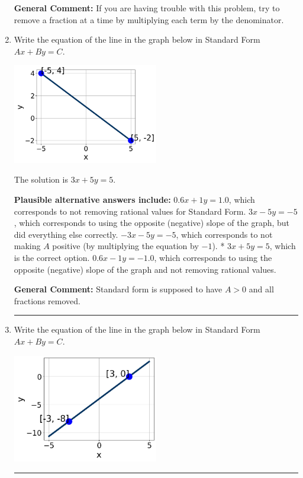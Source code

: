 \documentclass{extbook}[14pt]
\newcommand{\litem}[1]{\item #1

\rule{\textwidth}{0.4pt}}
\begin{document}
\begin{enumerate}
{\textbf{General Comment:} If you are having trouble with this problem, try to remove a fraction at a time by multiplying each term by the denominator.
}
\litem{
Write the equation of the line in the graph below in Standard Form $Ax+By=C$.

\begin{center}
    \includegraphics[width=0.5\textwidth]{../Figures/linearGraphToStandardC.png}
\end{center}


The solution is \( 3x + 5y = 5 \).\begin{enumerate}[label=\Alph*.]
\textbf{Plausible alternative answers include:} $0.6x + 1y = 1.0$, which corresponds to not removing rational values for Standard Form.
 $3x - 5y = -5$, which corresponds to using the opposite (negative) slope of the graph, but did everything else correctly.
 $-3x - 5y = -5$, which corresponds to not making $A$ positive (by multiplying the equation by $-1$).
* $3x + 5y = 5$, which is the correct option.
 $0.6x - 1y = -1.0$, which corresponds to using the opposite (negative) slope of the graph and not removing rational values.
\end{enumerate}

\textbf{General Comment:} Standard form is supposed to have $A > 0$ and all fractions removed.
}
\litem{
Write the equation of the line in the graph below in Standard Form $Ax+By=C$.

\begin{center}
    \includegraphics[width=0.5\textwidth]{../Figures/linearGraphToStandardCopyC.png}
\end{center}


}
\end{enumerate}
\end{document}
